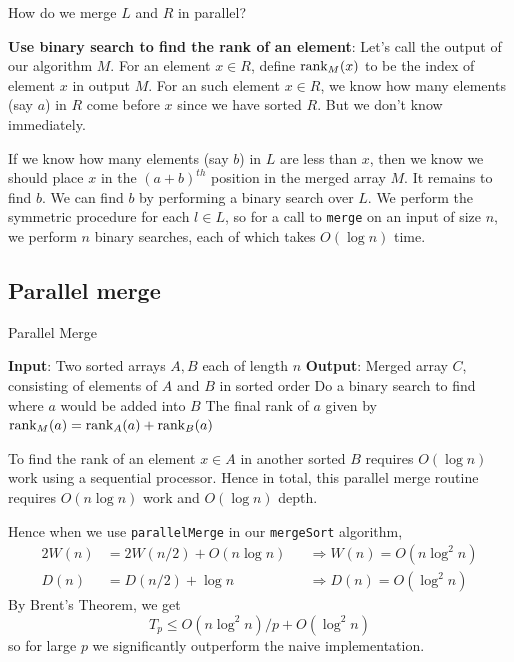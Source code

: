 \documentclass[11pt]{article}
\begin{document}
How do we merge \(L\) and \(R\) in parallel?

\textbf{Use binary search to find the rank of an element}: Let's call the output of our algorithm \(M\).
 For an element \(x\in R\), define \(\text{rank}_M(x)\) to be the index of element \(x\) in
 output \(M\). For an such element \(x\in R\), we know how many elements (say \(a\)) in \(R\) come
 before \(x\) since we have sorted \(R\). But we don't know immediately.

If we know how many elements (say \(b\)) in \(L\) are less than \(x\), then we know we should
place \(x\) in the \((a+b)^{th}\) position in the merged array \(M\). It remains to find \(b\).
We can find \(b\) by performing a binary search over \(L\). We perform the symmetric procedure
for each \(l\in L\), so for a call to \texttt{merge} on an input of size \(n\), we perform \(n\) binary
searches, each of which takes \(O(\log n)\) time.
\subsection{Parallel merge}
\label{sec:org0b5159c}
\begin{algorithm}
\caption{Parallel Merge}
\begin{algorithmic}[1]
\State \textbf{Input}: Two sorted arrays \(A,B\) each of length \(n\)
\State \textbf{Output}: Merged array \(C\), consisting of elements of \(A\) and \(B\) in sorted order
    \State Do a binary search to find where \(a\) would be added into \(B\)
    \State The final rank of \(a\) given by \(\text{rank}_M(a)=\text{rank}_A(a)+\text{rank}_B(a)\)
\EndFor
\end{algorithmic}
\end{algorithm}

To find the rank of an element \(x\in A\) in another sorted \(B\) requires \(O(\log n)\) work
using a sequential processor. Hence in total, this parallel merge routine
requires \(O(n\log n)\) work and \(O(\log n)\) depth.

Hence when we use \texttt{parallelMerge} in our \texttt{mergeSort} algorithm,
\begin{alignat*}{2}
W(n)&=2W(n/2)+O(n\log n)&&\Rightarrow W(n)=O(n\log^2n)\\
D(n)&=D(n/2)+\log n&&\Rightarrow D(n)=O(\log^2n)
\end{alignat*}
By Brent's Theorem, we get
\begin{equation*}
T_p\le O(n\log^2n)/p+O(\log^2n)
\end{equation*}
so for large \(p\) we significantly outperform the naive implementation.
\end{document}
